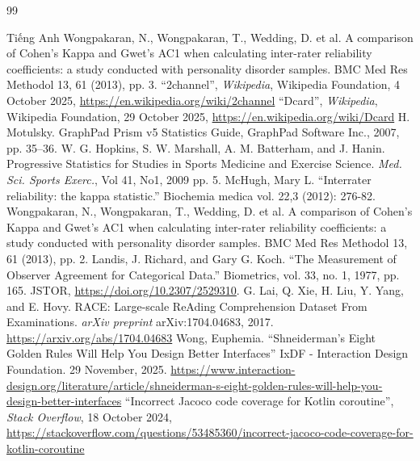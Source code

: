 \documentclass{uetgraduation}
\begin{document}
\begin{thebibliography}{99}
    \begin{bibsection}{Tiếng Anh}
            Wongpakaran, N., Wongpakaran, T., Wedding, D. et al. A comparison of Cohen’s Kappa and Gwet’s AC1 when calculating inter-rater reliability coefficients: a study conducted with personality disorder samples. BMC Med Res Methodol 13, 61 (2013), pp. 3.
            ``2channel'', \textit{Wikipedia}, Wikipedia Foundation, 4 October 2025, \url{https://en.wikipedia.org/wiki/2channel}
            ``Dcard'', \textit{Wikipedia}, Wikipedia Foundation, 29 October 2025, \url{https://en.wikipedia.org/wiki/Dcard}
            H. Motulsky. GraphPad Prism v5 Statistics Guide, GraphPad Software Inc., 2007, pp. 35--36.
            W. G. Hopkins, S. W. Marshall, A. M. Batterham, and J. Hanin. Progressive Statistics for Studies in Sports Medicine and Exercise Science. \textit{Med. Sci. Sports Exerc.}, Vol 41, No1, 2009 pp. 5.
            McHugh, Mary L. “Interrater reliability: the kappa statistic.” Biochemia medica vol. 22,3 (2012): 276-82.
            Wongpakaran, N., Wongpakaran, T., Wedding, D. et al. A comparison of Cohen’s Kappa and Gwet’s AC1 when calculating inter-rater reliability coefficients: a study conducted with personality disorder samples. BMC Med Res Methodol 13, 61 (2013), pp. 2.
            Landis, J. Richard, and Gary G. Koch. “The Measurement of Observer Agreement for Categorical Data.” Biometrics, vol. 33, no. 1, 1977, pp. 165. JSTOR, \url{https://doi.org/10.2307/2529310}.
            G. Lai, Q. Xie, H. Liu, Y. Yang, and E. Hovy. RACE: Large-scale ReAding Comprehension Dataset From Examinations. \textit{arXiv preprint} arXiv:1704.04683, 2017. \url{https://arxiv.org/abs/1704.04683}
            Wong, Euphemia. “Shneiderman’s Eight Golden Rules Will Help You Design Better Interfaces” IxDF - Interaction Design Foundation. 29 November, 2025. \url{https://www.interaction-design.org/literature/article/shneiderman-s-eight-golden-rules-will-help-you-design-better-interfaces}
            ``Incorrect Jacoco code coverage for Kotlin coroutine'', \textit{Stack Overflow}, 18 October 2024, \url{https://stackoverflow.com/questions/53485360/incorrect-jacoco-code-coverage-for-kotlin-coroutine}
    \end{bibsection}
\end{thebibliography}
\end{document}
